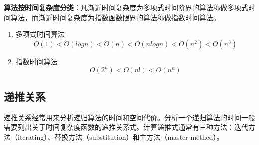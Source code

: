 \textbf{算法按时间复杂度分类}：凡渐近时间复杂度为多项式时间阶界的算法称做多项式时间算法，而渐近时间复杂度为指数函数限界的算法称做指数时间算法。
\begin{enumerate}
	\item 多项式时间算法
	\begin{equation}
		O(1) < O(log n) < O(n) < O(nlog n) < O(n^2) < O(n^3)
	\end{equation}
	\item 指数时间算法
	\begin{equation}
		O(2^n) < O(n!) < O(n^n)
	\end{equation}
\end{enumerate}

\subsection*{递推关系} 
递推关系经常用来分析递归算法的时间和空间代价。分析一个递归算法的时间一般需要列出关于时间复杂度函数的递推关系式。计算递推式通常有三种方法：迭代方法（iterating）、替换方法（substitution）和主方法（master methed）。
